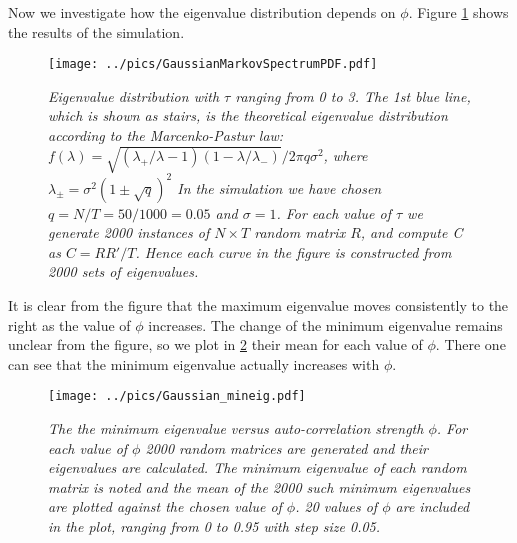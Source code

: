 Now we investigate how the eigenvalue distribution depends on
$\phi$. Figure \ref{fig:GaussianMarkovSpectrumPDF} shows the results
of the simulation.
\begin{figure}[htb!]
  \begin{center}
    \texttt{[image: ../pics/GaussianMarkovSpectrumPDF.pdf]}
  \end{center}
  \caption{\small \it
      Eigenvalue distribution with $\tau$ ranging from 0 to
      3. The 1st blue line, which is shown as stairs, is the
      theoretical eigenvalue distribution according to the
      Marcenko-Pastur law: $f(\lambda) = \sqrt{(\lambda_+/\lambda - 1)(1
        - \lambda/\lambda_-)}/2\pi q \sigma^2$, where $\lambda_{\pm} =
      \sigma^2(1 \pm \sqrt{q})^2$ In the simulation we have
      chosen $q = N/T = 50/1000 = 0.05$ and $\sigma=1$. For each value
      of $\tau$ we generate 2000 instances of $N \times T$ random matrix
      $R$, and compute C as $C=RR'/T$. Hence each curve in the figure is
      constructed from 2000 sets of eigenvalues.
    }
  \label{fig:GaussianMarkovSpectrumPDF}
\end{figure}
It is clear from the figure that the maximum eigenvalue moves
consistently to the right as the value of $\phi$ increases. The change
of the minimum eigenvalue remains unclear from the figure, so we plot
in \ref{fig:Gaussian_mineig} their mean for each value of
$\phi$. There one can see that the minimum eigenvalue actually
increases with $\phi$.
\begin{figure}[htb!]
  \centering
  \texttt{[image: ../pics/Gaussian\_mineig.pdf]}
  \caption{\small \it The the minimum eigenvalue versus
    auto-correlation strength $\phi$. For each value of $\phi$ 2000
    random matrices are generated and their eigenvalues are
    calculated. The minimum eigenvalue of each random matrix is noted
    and the mean of the 2000 such minimum eigenvalues are plotted
    against the chosen value of $\phi$. 20 values of $\phi$ are
    included in the plot, ranging from 0 to 0.95 with step size 0.05.}
  \label{fig:Gaussian_mineig}
\end{figure}

